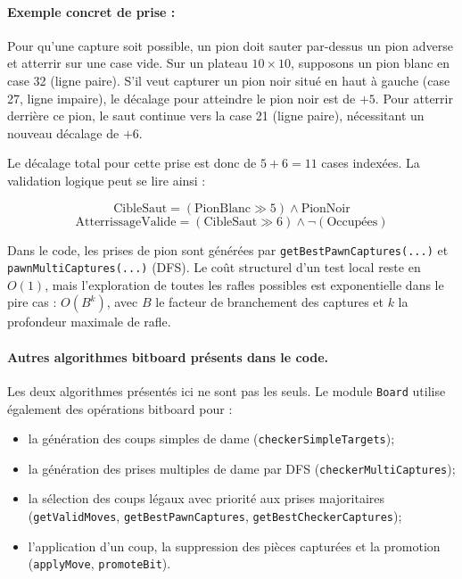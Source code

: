 \documentclass[a4paper]{article}
\begin{document}
\paragraph{Exemple concret de prise :}
Pour qu'une capture soit possible, un pion doit sauter par-dessus un pion adverse et atterrir sur une case vide. 
Sur un plateau \(10 \times 10\), supposons un pion blanc en case 32 (ligne paire). 
S'il veut capturer un pion noir situé en haut à gauche (case 27, ligne impaire), 
le décalage pour atteindre le pion noir est de \(+5\). Pour atterrir derrière ce pion, 
le saut continue vers la case 21 (ligne paire), nécessitant un nouveau décalage de \(+6\).

Le décalage total pour cette prise est donc de \(5 + 6 = 11\) cases indexées.
La validation logique peut se lire ainsi :

\[
\text{CibleSaut} = (\text{PionBlanc} \gg 5) \land \text{PionNoir}
\]
\[
\text{AtterrissageValide} = (\text{CibleSaut} \gg 6) \land \lnot(\text{Occupées})
\]

Dans le code, les prises de pion sont générées par \texttt{getBestPawnCaptures(...)} et
\texttt{pawnMultiCaptures(...)} (DFS). Le coût structurel d'un test local reste en \(O(1)\),
mais l'exploration de toutes les rafles possibles est exponentielle dans le pire cas :
\(O(B^k)\), avec \(B\) le facteur de branchement des captures et \(k\) la profondeur
maximale de rafle.

\paragraph{Autres algorithmes bitboard présents dans le code.}
Les deux algorithmes présentés ici ne sont pas les seuls. Le module \texttt{Board} utilise
également des opérations bitboard pour :
\begin{itemize}
  \item la génération des coups simples de dame (\texttt{checkerSimpleTargets});
  \item la génération des prises multiples de dame par DFS (\texttt{checkerMultiCaptures});
  \item la sélection des coups légaux avec priorité aux prises majoritaires
  (\texttt{getValidMoves}, \texttt{getBestPawnCaptures}, \texttt{getBestCheckerCaptures});
  \item l'application d'un coup, la suppression des pièces capturées et la promotion
  (\texttt{applyMove}, \texttt{promoteBit}).
\end{itemize}
\end{document}
